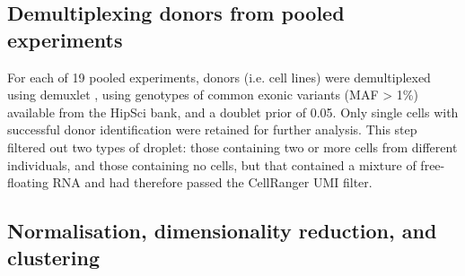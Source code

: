 \newpage

\subsection{Demultiplexing donors from pooled experiments}

For each of 19 pooled experiments, donors (i.e. cell lines) were demultiplexed using demuxlet \cite{kang2018multiplexed}, using genotypes of common exonic variants (MAF > 1\%) available from the HipSci bank, and a doublet prior of 0.05. 
Only single cells with successful donor identification were retained for further analysis. 
This step filtered out two types of droplet: those containing two or more cells from different individuals, and those containing no cells, but that contained a mixture of free-floating RNA and had therefore passed the CellRanger UMI filter.



\subsection{Normalisation, dimensionality reduction, and clustering}

